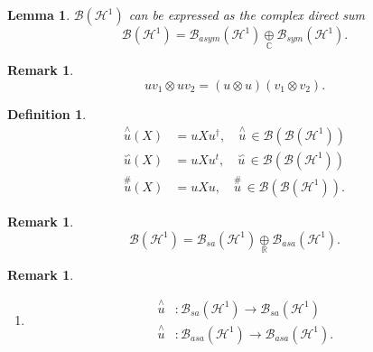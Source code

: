 \documentclass[aps,preprint]{revtex4}%
\newtheorem{definition}[theorem]{Definition}
\newtheorem{lemma}[theorem]{Lemma}
\newtheorem{remark}[theorem]{Remark}
\begin{document}
\begin{enumerate}
\begin{enumerate}
\end{enumerate}

\begin{lemma}
$\mathcal{B}\left(  \mathcal{H}^{1}\right)  $ can be expressed as the complex
direct sum
\begin{equation}
\mathcal{B}\left(  \mathcal{H}^{1}\right)  =\mathcal{B}_{asym}\left(
\mathcal{H}^{1}\right)  \underset{\mathbb{C}}{\oplus}\mathcal{B}_{sym}\left(
\mathcal{H}^{1}\right)  .
\end{equation}

\end{lemma}

\begin{remark}%
\begin{equation}
uv_{1}\otimes uv_{2}=\left(  u\otimes u\right)  \left(  v_{1}\otimes
v_{2}\right)  .
\end{equation}

\end{remark}

\begin{definition}%
\begin{align}
\overset{\wedge}{u}\left(  X\right)   &  =uXu^{\dagger},\quad\overset{\wedge
}{u}\,\in\mathcal{B}\left(  \mathcal{B}\left(  \mathcal{H}^{1}\right)  \right)
\\
\overset{\backsim}{u}\left(  X\right)   &  =uXu^{t},\quad\overset{\backsim
}{u}\,\in\mathcal{B}\left(  \mathcal{B}\left(  \mathcal{H}^{1}\right)  \right)
\\
\overset{\#}{u}\left(  X\right)   &  =uXu,\quad\overset{\#}{u}\,\in
\mathcal{B}\left(  \mathcal{B}\left(  \mathcal{H}^{1}\right)  \right)  .
\end{align}

\end{definition}

\begin{remark}%
\begin{equation}
\mathcal{B}\left(  \mathcal{H}^{1}\right)  =\mathcal{B}_{sa}\left(
\mathcal{H}^{1}\right)  \underset{\mathbb{R}}{\oplus}\mathcal{B}_{asa}\left(
\mathcal{H}^{1}\right)  .
\end{equation}

\end{remark}

\begin{remark}
\begin{enumerate}
\item
\begin{align}
\overset{\wedge}{u}  &  :\mathcal{B}_{sa}\left(  \mathcal{H}^{1}\right)
\rightarrow\mathcal{B}_{sa}\left(  \mathcal{H}^{1}\right) \\
\overset{\wedge}{u}  &  :\mathcal{B}_{asa}\left(  \mathcal{H}^{1}\right)
\rightarrow\mathcal{B}_{asa}\left(  \mathcal{H}^{1}\right)  .
\end{align}



\end{enumerate}
\end{remark}
\end{enumerate}
\end{document}
